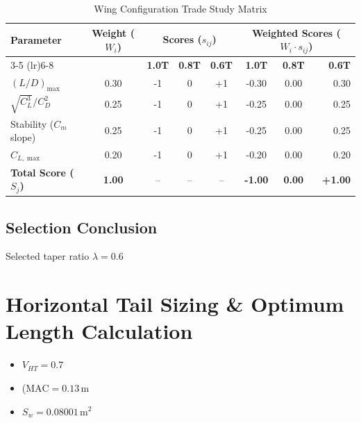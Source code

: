 \documentclass[11pt,a4paper]{article}
\begin{document}
\begin{table}[H]
\centering
\caption{Wing Configuration Trade Study Matrix}
\label{tab:wing_trade_matrix}
\begin{tabular}{lccccccr}
\toprule
\multirow{2}{*}{\textbf{Parameter}} & \multirow{2}{*}{\textbf{Weight ($W_i$)}} & \multicolumn{3}{c}{\textbf{Scores ($s_{ij}$)}} & \multicolumn{3}{c}{\textbf{Weighted Scores ($W_i \cdot s_{ij}$)}} \\
\cmidrule(lr){3-5} \cmidrule(lr){6-8}
& & \textbf{1.0T} & \textbf{0.8T} & \textbf{0.6T} & \textbf{1.0T} & \textbf{0.8T} & \textbf{0.6T} \\
\midrule
$(L/D)_{\max}$          & 0.30 & -1 & 0  & +1 & -0.30 & 0.00  & 0.30 \\
$\sqrt{C_L^3}/C_D^2$   & 0.25 & -1 & 0  & +1 & -0.25 & 0.00  & 0.25 \\
Stability ($C_m$ slope) & 0.25 & -1 & 0  & +1 & -0.25 & 0.00  & 0.25 \\
$C_{L,\max}$            & 0.20 & -1 & 0  & +1 & -0.20 & 0.00  & 0.20 \\
\midrule
\textbf{Total Score ($S_j$)} & \textbf{1.00} & -- & -- & -- & \textbf{-1.00} & \textbf{0.00} & \textbf{+1.00} \\
\bottomrule
\end{tabular}
\end{table}


\subsection{Selection Conclusion}
Selected taper ratio $\lambda = 0.6$

\section{Horizontal Tail Sizing \& Optimum Length Calculation}

\begin{itemize}
    \item $V_{HT} = 0.7$
    \item ($\text{MAC} = 0.13\,\text{m}$
    \item $S_w = 0.08001\,\text{m}^2$
\end{itemize}
  
\end{document}
